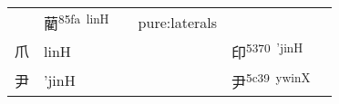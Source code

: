 \documentclass[14pt,a4paper]{scrartcl}
\begin{document}
\begin{longtable}[c]{@{}llllll@{}}
\begin{minipage}[t]{0.14\columnwidth}
\strut\end{minipage} &
\begin{minipage}[t]{0.14\columnwidth}\raggedright\strut
藺\textsuperscript{85fa~linH}
\strut\end{minipage} &
\begin{minipage}[t]{0.14\columnwidth}\raggedright\strut
\strut\end{minipage} &
\begin{minipage}[t]{0.14\columnwidth}\raggedright\strut
pure:laterals
\strut\end{minipage}\tabularnewline
\begin{minipage}[t]{0.14\columnwidth}\raggedright\strut
爪
\strut\end{minipage} &
\begin{minipage}[t]{0.14\columnwidth}\raggedright\strut
linH
\strut\end{minipage} &
\begin{minipage}[t]{0.14\columnwidth}\raggedright\strut
\strut\end{minipage} &
\begin{minipage}[t]{0.14\columnwidth}\raggedright\strut
\strut\end{minipage} &
\begin{minipage}[t]{0.14\columnwidth}\raggedright\strut
印\textsuperscript{5370~'jinH}
\strut\end{minipage} &
\begin{minipage}[t]{0.14\columnwidth}\raggedright\strut
\strut\end{minipage}\tabularnewline
\begin{minipage}[t]{0.14\columnwidth}\raggedright\strut
尹
\strut\end{minipage} &
\begin{minipage}[t]{0.14\columnwidth}\raggedright\strut
'jinH
\strut\end{minipage} &
\begin{minipage}[t]{0.14\columnwidth}\raggedright\strut
\strut\end{minipage} &
\begin{minipage}[t]{0.14\columnwidth}\raggedright\strut
\strut\end{minipage} &
\begin{minipage}[t]{0.14\columnwidth}\raggedright\strut
尹\textsuperscript{5c39~ywinX}
\strut\end{minipage} &
\begin{minipage}[t]{0.14\columnwidth}\raggedright\strut
\strut\end{minipage}\tabularnewline

\end{longtable}
\end{document}
